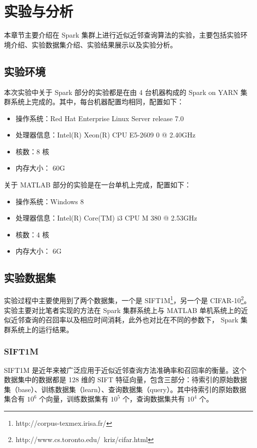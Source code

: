 

\chapter{实验与分析}
\label{cha:experiments_analysis}
本章节主要介绍在 Spark 集群上进行近似近邻查询算法的实验，主要包括实验环境介绍、实验数据集介绍、实验结果展示以及实验分析。
\section{实验环境}
本次实验中关于 Spark 部分的实验都是在由 4 台机器构成的 Spark on YARN 集群系统上完成的。其中，每台机器配置均相同，配置如下：
\begin{itemize}
\item 操作系统：Red Hat Enterprise Linux Server release 7.0
\item 处理器信息：Intel(R) Xeon(R) CPU E5-2609 0 @ 2.40GHz
\item 核数：8 核
\item 内存大小： 60G
\end{itemize}

关于 MATLAB 部分的实验是在一台单机上完成，配置如下：
\begin{itemize}
\item 操作系统：Windows 8
\item 处理器信息：Intel(R) Core(TM) i3 CPU M 380 @ 2.53GHz
\item 核数：4 核
\item 内存大小： 6G
\end{itemize}
\section{实验数据集}
实验过程中主要使用到了两个数据集，一个是 SIFT1M\footnote{http://corpus-texmex.irisa.fr/}，另一个是 CIFAR-10\footnote{http://www.cs.toronto.edu/~kriz/cifar.html}。实验主要对比笔者实现的方法在 Spark 集群系统上与 MATLAB 单机系统上的近似近邻查询的召回率以及相应时间消耗，此外也对比在不同的参数下， Spark 集群系统上的运行结果。
\subsection{SIFT1M}
SIFT1M 是近年来被广泛应用于近似近邻查询方法准确率和召回率的衡量。这个数据集中的数据都是 128 维的 SIFT 特征向量，包含三部分：待索引的原始数据集（base）、训练数据集（learn）、查询数据集（query）。其中待索引的原始数据集合有 $10^6$ 个向量，训练数据集有 $10^5$ 个，查询数据集共有 $10^4$ 个。
